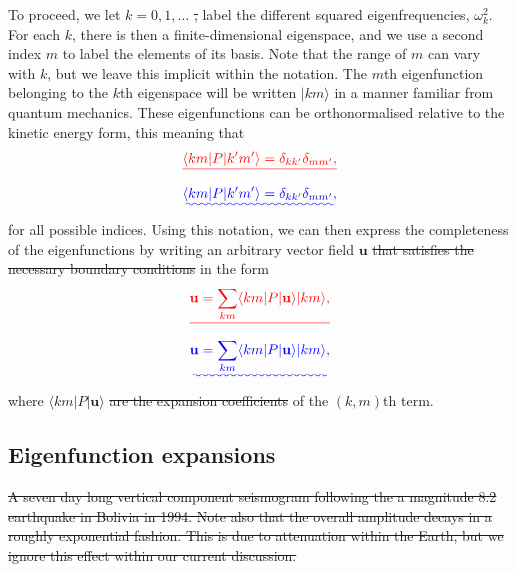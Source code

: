 \documentclass[a4paper,12pt]{paper}
\providecommand{\DIFadd}[1]{{\protect\color{blue}\uwave{#1}}} %
\providecommand{\DIFdel}[1]{{\protect\color{red}\sout{#1}}}                      %
\providecommand{\DIFaddbegin}{} %
\providecommand{\DIFaddend}{} %
\providecommand{\DIFdelbegin}{} %
\providecommand{\DIFdelend}{} %
\providecommand{\DIFdelFL}[1]{\DIFdel{#1}} %
\begin{document}
To proceed, we let $k=0,1,\dots$ \DIFdelbegin \DIFdel{, }\DIFdelend label the different squared eigenfrequencies, $\omega_{k}^{2}$. For each $k$, there is then a 
finite-dimensional eigenspace, and we use a second index $m$ to label the elements of its basis. Note that the range of $m$ can 
vary with $k$, but we leave this implicit within the notation. The $m$th eigenfunction belonging to the $k$th eigenspace will be 
written $|km\rangle$ in a manner familiar from quantum mechanics. These eigenfunctions can be orthonormalised relative to the kinetic 
energy form, this meaning that
\DIFdelbegin \begin{displaymath}
\DIFdel{\langle km|P|k'm'\rangle=\delta_{kk'}\delta_{mm'},
}\end{displaymath}%
\DIFdelend \DIFaddbegin \begin{equation}
\DIFadd{\langle km|P|k'm'\rangle=\delta_{kk'}\delta_{mm'},
\label{eq:25}
}\end{equation}\DIFaddend 
for all possible indices. Using this notation, we can then express the completeness of the eigenfunctions by writing 
an arbitrary vector field $\mathbf{u}$ \DIFdelbegin \DIFdel{that satisfies the necessary boundary conditions }\DIFdelend in the form
\DIFdelbegin \begin{displaymath}
\DIFdel{\mathbf{u}=\sum_{km}\langle km|P|\mathbf{u}\rangle|km\rangle ,
}\end{displaymath}%
\DIFdelend \DIFaddbegin \begin{equation}
\DIFadd{\mathbf{u}=\sum_{km}\langle km|P|\mathbf{u}\rangle|km\rangle,
\label{eq:26}
}\end{equation}\DIFaddend 
where $\langle km|P|\mathbf{u}\rangle$ \DIFdelbegin \DIFdel{are the expansion coefficients }\DIFdelend \DIFaddbegin \DIFadd{is the expansion coefficient }\DIFaddend of the $(k,m)$th term.

\subsection*{Eigenfunction expansions}

\DIFdelbegin %
{%
\DIFdelFL{A seven day long vertical component seismogram following the a magnitude 8.2
earthquake in Bolivia in 1994. Note also that the overall amplitude decays in a
roughly exponential fashion. This is due to attenuation within the Earth, but we
ignore this effect within our current discussion.}}
\end{document}
